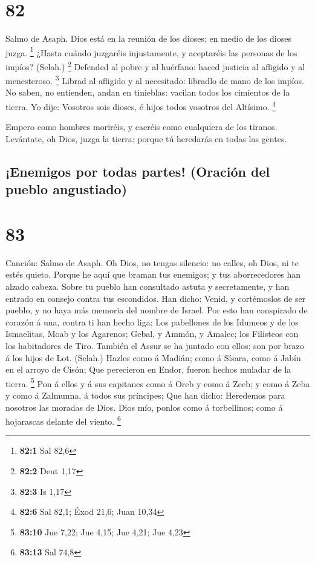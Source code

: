\hypertarget{section-81}{%
\section{82}\label{section-81}}

 Salmo de Asaph. Dios está en la reunión de los dioses; en
medio de los dioses juzga. \footnote{\textbf{82:1} Sal 82,6}
 ¿Hasta cuándo juzgaréis injustamente, y aceptaréis las
personas de los impíos? (Selah.) \footnote{\textbf{82:2} Deut 1,17}
 Defended al pobre y al huérfano: haced justicia al afligido
y al menesteroso. \footnote{\textbf{82:3} Is 1,17}  Librad
al afligido y al necesitado: libradlo de mano de los impíos.
 No saben, no entienden, andan en tinieblas: vacilan todos
los cimientos de la tierra.  Yo dije: Vosotros sois dioses,
é hijos todos vosotros del Altísimo. \footnote{\textbf{82:6} Sal 82,1;
  Éxod 21,6; Juan 10,34}

 Empero como hombres moriréis, y caeréis como cualquiera de
los tiranos.  Levántate, oh Dios, juzga la tierra: porque tú
heredarás en todas las gentes.

\hypertarget{enemigos-por-todas-partes-oraciuxf3n-del-pueblo-angustiado}{%
\subsection{¡Enemigos por todas partes! (Oración del pueblo
angustiado)}\label{enemigos-por-todas-partes-oraciuxf3n-del-pueblo-angustiado}}

\hypertarget{section-82}{%
\section{83}\label{section-82}}

 Canción: Salmo de Asaph. Oh Dios, no tengas silencio: no
calles, oh Dios, ni te estés quieto.  Porque he aquí que
braman tus enemigos; y tus aborrecedores han alzado cabeza. 
Sobre tu pueblo han consultado astuta y secretamente, y han entrado en
consejo contra tus escondidos.  Han dicho: Venid, y
cortémoslos de ser pueblo, y no haya más memoria del nombre de Israel.
 Por esto han conspirado de corazón á una, contra ti han
hecho liga;  Los pabellones de los Idumeos y de los
Ismaelitas, Moab y los Agarenos;  Gebal, y Ammón, y Amalec;
los Filisteos con los habitadores de Tiro.  También el Assur
se ha juntado con ellos: son por brazo á los hijos de Lot. (Selah.)
 Hazles como á Madián; como á Sísara, como á Jabín en el
arroyo de Cisón;  Que perecieron en Endor, fueron hechos
muladar de la tierra. \footnote{\textbf{83:10} Jue 7,22; Jue 4,15; Jue
  4,21; Jue 4,23}  Pon á ellos y á sus capitanes como á
Oreb y como á Zeeb; y como á Zeba y como á Zalmunna, á todos sus
príncipes;  Que han dicho: Heredemos para nosotros las
moradas de Dios.  Dios mío, ponlos como á torbellinos; como
á hojarascas delante del viento. \footnote{\textbf{83:13} Sal 74,8}

